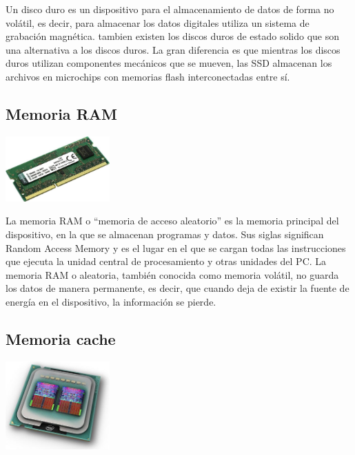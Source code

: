 \documentclass[a4paper]{article}
\begin{document}
Un disco duro es un dispositivo para el almacenamiento de datos de forma no volátil, es decir, para almacenar los datos digitales utiliza un sistema de grabación magnética. tambien existen los discos duros de estado solido que son una alternativa a los discos duros. La gran diferencia es que mientras los discos duros utilizan componentes mecánicos que se mueven, las SSD almacenan los archivos en microchips con memorias flash interconectadas entre sí.

\subsection{Memoria RAM}

    \begin{center}
    \includegraphics[width=0.3\textwidth]{images/ram.jpg}
    \end{center}

La memoria RAM o “memoria de acceso aleatorio” es la memoria principal del dispositivo, en la que se almacenan programas y datos. Sus siglas significan Random Access Memory y es el lugar en el que se cargan todas las instrucciones que ejecuta la unidad central de procesamiento y otras unidades del PC. La memoria RAM o aleatoria, también conocida como memoria volátil, no guarda los datos de manera permanente, es decir, que cuando deja de existir la fuente de energía en el dispositivo, la información se pierde.

\subsection{Memoria cache}

    \begin{center}
    \includegraphics[width=0.3\textwidth]{images/cache.jpg}
    \end{center}
    
\end{document}
